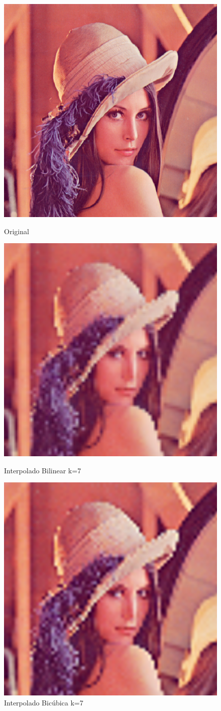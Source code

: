 \documentclass[12pt]{article}
\begin{document}
\begin{figure}[H]
  \centering
  \begin{minipage}{.5\textwidth}
    \centering
    \includegraphics[width=.4\linewidth]{imagens/img_lenna/lenna.png}
    \caption{Original}
  \end{minipage}
  \begin{minipage}{.5\linewidth}
  \end{minipage}
  \begin{minipage}{.5\textwidth}
    \centering
    \includegraphics[width=.4\linewidth]{imagens/img_lenna/lenna_1_7_1.png}
    \caption{Interpolado Bilinear k=7}
  \end{minipage}%
  \begin{minipage}{.5\textwidth}
    \centering
    \includegraphics[width=.4\linewidth]{imagens/img_lenna/lenna_2_7_1.png}
    \caption{Interpolado Bicúbica k=7}
  \end{minipage}
\end{figure}
\end{document}
